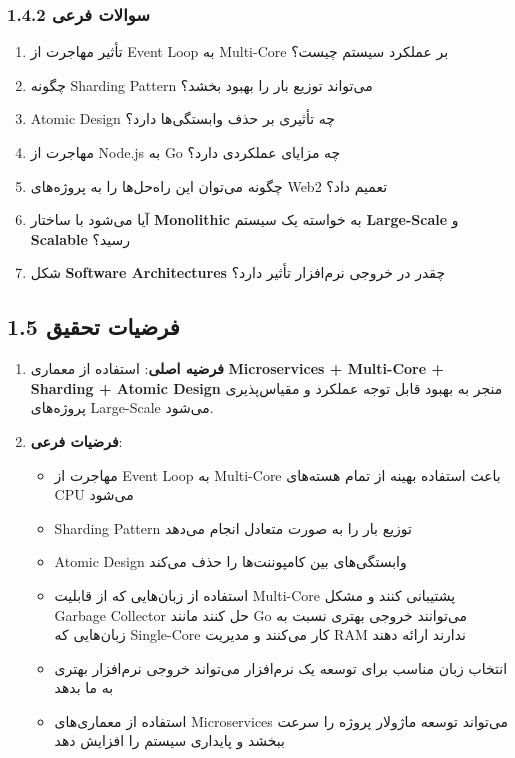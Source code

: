 \documentclass[
]{article}
\providecommand{\tightlist}{%
  \setlength{\itemsep}{0pt}\setlength{\parskip}{0pt}}
\begin{document}
\subsubsection{1.4.2 سوالات
فرعی}\label{ux633ux648ux627ux644ux627ux62a-ux641ux631ux639ux6cc}

\begin{enumerate}
\def\labelenumi{\arabic{enumi}.}
\tightlist
\item
  تأثیر مهاجرت از Event Loop به Multi-Core بر عملکرد سیستم چیست؟
\item
  چگونه Sharding Pattern می‌تواند توزیع بار را بهبود بخشد؟
\item
  Atomic Design چه تأثیری بر حذف وابستگی‌ها دارد؟
\item
  مهاجرت از Node.js به Go چه مزایای عملکردی دارد؟
\item
  چگونه می‌توان این راه‌حل‌ها را به پروژه‌های Web2 تعمیم داد؟
\item
  آیا می‌شود با ساختار \textbf{Monolithic} به خواسته یک سیستم
  \textbf{Large-Scale} و \textbf{Scalable} رسید؟
\item
  شکل \textbf{Software Architectures} چقدر در خروجی نرم‌افزار تأثیر دارد؟
\end{enumerate}

\subsection{1.5 فرضیات
تحقیق}\label{ux641ux631ux636ux6ccux627ux62a-ux62aux62dux642ux6ccux642}

\begin{enumerate}
\def\labelenumi{\arabic{enumi}.}
\item
  \textbf{فرضیه اصلی}: استفاده از معماری \textbf{Microservices +
  Multi-Core + Sharding + Atomic Design} منجر به بهبود قابل توجه عملکرد
  و مقیاس‌پذیری پروژه‌های Large-Scale می‌شود.
\item
  \textbf{فرضیات فرعی}:

  \begin{itemize}
  \tightlist
  \item
    مهاجرت از Event Loop به Multi-Core باعث استفاده بهینه از تمام
    هسته‌های CPU می‌شود
  \item
    Sharding Pattern توزیع بار را به صورت متعادل انجام می‌دهد
  \item
    Atomic Design وابستگی‌های بین کامپوننت‌ها را حذف می‌کند
  \item
    استفاده از زبان‌هایی که از قابلیت Multi-Core پشتیبانی کنند و مشکل
    Garbage Collector حل کنند مانند Go می‌توانند خروجی بهتری نسبت به
    زبان‌هایی که Single-Core کار می‌کنند و مدیریت RAM ندارند ارائه دهند
  \item
    انتخاب زبان مناسب برای توسعه یک نرم‌افزار می‌تواند خروجی نرم‌افزار
    بهتری به ما بدهد
  \item
    استفاده از معماری‌های Microservices می‌تواند توسعه ماژولار پروژه را
    سرعت ببخشد و پایداری سیستم را افزایش دهد
  \end{itemize}
\end{enumerate}
\end{document}
